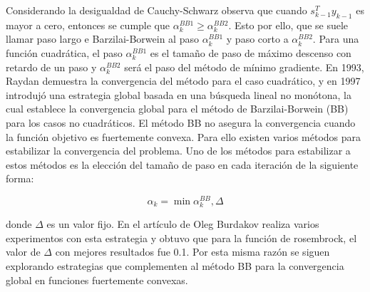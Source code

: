 Considerando la desigualdad de Cauchy-Schwarz observa que cuando $s_{k-1}^Ty_{k-1}$ es mayor a cero, entonces se cumple que $\alpha_k^{BB1} \geq \alpha_k^{BB2}$. Esto por ello, que se suele llamar paso largo e Barzilai-Borwein al paso $\alpha_k^{BB1}$ y paso corto a $\alpha_k^{BB2}$. Para una función cuadrática, el paso $\alpha_k^{BB1}$ es el tamaño de paso de máximo descenso con retardo de un paso y $\alpha_k^{BB2}$ será el paso del método de mínimo gradiente. En 1993, Raydan demuestra la convergencia del método para el caso cuadrático\cite{raydan_1993}, y en 1997 introdujó una estrategia global basada en una búsqueda lineal no monótona, la cual establece la convergencia global para el método de Barzilai-Borwein (BB) para los casos no cuadráticos. El método BB no asegura la convergencia cuando la función objetivo es fuertemente convexa. Para ello existen varios métodos para estabilizar la convergencia del problema. Uno de los métodos para estabilizar a estos métodos es la elección del tamaño de paso en cada iteración de la siguiente forma:

\begin{equation}
    \alpha_k = \min \alpha_k^{BB}, \Delta
\end{equation}

donde $\Delta$ es un valor fijo. En el artículo de Oleg Burdakov\cite{burdakob_2019} realiza varios experimentos con esta estrategia y obtuvo que para la función de rosembrock, el valor de $\Delta$ con mejores resultados fue 0.1. Por esta misma razón se siguen explorando estrategias que complementen al método BB para la convergencia global en funciones fuertemente convexas.